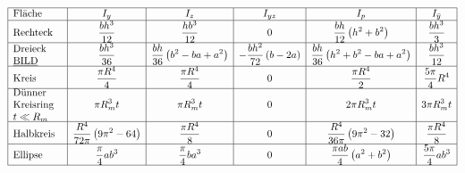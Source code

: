 \documentclass[11pt]{article}
\newcommand{\1}{ {\mathds{1}} }
\begin{document}
	\arraycolsep=2pt
	\def\arraystretch{2}	
	{
		\colorbox{green!60!white!50}
		{
			\begin{equation*}
				\begin{array}{|l|*5{>{\displaystyle}c|}}
					\hline 
					\text{Fläche}                                    &               I_y                            &                                        I_z &                                I_{yz} &                                    I_p          & I_{\bar{y}} \\ \hline 
					\text{Rechteck}                                  &   \frac{bh^3}{12}                            &                            \frac{hb^3}{12} &                                     0 & \frac{bh}{12} \left( h^2 + b^2 \right)          & \frac{bh^3}{3} \\ \hline 
					\text{\parbox{1.5cm}{Dreieck \underline{BILD}}}    &   \frac{bh^3}{36}                            & \frac{bh}{36}\left( b^2 -ba + a^2 \right)  & -\frac{bh^2}{72}\left( b - 2a \right) & \frac{bh}{36}\left( h^2 + b^2 -ba + a^2 \right) & \frac{bh^3}{12} \\ \hline 
					\text{Kreis}                                     & \frac{\pi R^4}{4}                            &                          \frac{\pi R^4}{4} &                                     0 &                               \frac{\pi R^4}{2} & \frac{5 \pi}{4}R^4 \\ \hline 
					\text{\parbox{1.7cm}{Dünner Kreisring $t\ll R_m$}} &       \pi R^3_m t                            &                                \pi R^3_m t &                                     0 &                                    2\pi R^3_m t & 3\pi R^3_m t \\ \hline 
					\text{Halbkreis}                                 & \frac{R^4}{72 \pi}\left( 9 \pi^2 -64 \right) &                          \frac{\pi R^4}{8} &                                     0 &    \frac{R^4}{36 \pi}\left( 9 \pi^2 -32 \right) & \frac{\pi R^4}{8} \\ \hline 
					\text{Ellipse}                                   & \frac{\pi}{4}ab^3                            &                          \frac{\pi}{4}ba^3 &                                     0 &        \frac{\pi ab}{4}\left( a^2 + b^2 \right) & \frac{5\pi}{4}ab^3 \\ \hline 
				\end{array}
			\end{equation*}
		}
	}
\end{document}
